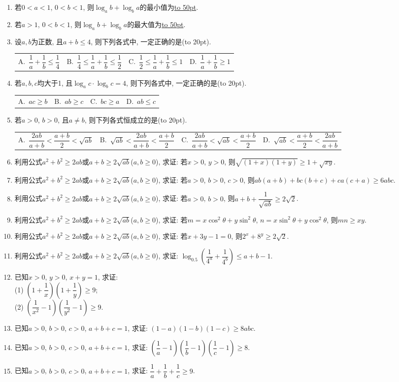 \documentclass[10pt,a4paper]{article}
\newcommand{\blank}[1]{\underline{\hbox to #1pt{}}}
\newcommand{\bracket}[1]{(\hbox to #1pt{})}
\newcommand{\fourch}[4]{\par\begin{tabular}{p{.23\textwidth}p{.23\textwidth}p{.23\textwidth}p{.23\textwidth}}
A.~#1 &B.~#2& C.~#3& D.~#4
\end{tabular}}
\begin{document}
\begin{enumerate}[1.]
\item 若$0<a<1$, $0<b<1$, 则$\log_ab+\log_ba$的最小值为\blank{50}.
\item 若$a>1$, $0<b<1$, 则$\log_ab+\log_ba$的最大值为\blank{50}.
\item 设$a,b$为正数, 且$a+b\le 4$, 则下列各式中, 一定正确的是\bracket{20}.
\fourch{$\dfrac 1a+\dfrac 1b\le \dfrac 14$}{$\dfrac 14\le \dfrac 1a+\dfrac 1b\le \dfrac 12$}{$\dfrac 12\le \dfrac 1a+\dfrac 1b\le 1$}{$\dfrac 1a+\dfrac 1b\ge 1$}
\item 若$a,b,c$均大于1, 且$\log_ac\cdot \log_bc=4$, 则下列各式中, 一定正确的是\bracket{20}.
\fourch{$ac\ge b$}{$ab\ge c$}{$bc\ge a$}{$ab\le c$}
\item 若$a>0$, $b>0$, 且$a\ne b$, 则下列各式恒成立的是\bracket{20}.
\fourch{$\dfrac{2ab}{a+b}<\dfrac{a+b}2<\sqrt{ab}$}{$\sqrt{ab}<\dfrac{2ab}{a+b}<\dfrac{a+b}2$}{$\dfrac{2ab}{a+b}<\sqrt{ab}<\dfrac{a+b}2$}{$\sqrt{ab}<\dfrac{a+b}2<\dfrac{2ab}{a+b}$}
\item 利用公式$a^2+b^2\ge 2ab$或$a+b\ge 2\sqrt{ab}$($a,b\ge 0$), 求证:
若$x>0$, $y>0$, 则$\sqrt{(1+x)(1+y)}\ge 1+\sqrt{xy}$.
\item 利用公式$a^2+b^2\ge 2ab$或$a+b\ge 2\sqrt{ab}$($a,b\ge 0$), 求证: 若$a>0$, $b>0$, $c>0$, 则$ab(a+b)+bc(b+c)+ca(c+a)\ge 6abc$.
\item 利用公式$a^2+b^2\ge 2ab$或$a+b\ge 2\sqrt{ab}$($a,b\ge 0$), 求证: 若$a>0$, $b>0$, 则$a+b+\dfrac 1{\sqrt{ab}}\ge 2\sqrt 2$.
\item 利用公式$a^2+b^2\ge 2ab$或$a+b\ge 2\sqrt{ab}$($a,b\ge 0$), 求证: 若$m=x{{\cos }^2}\theta +y{{\sin }^2}\theta$, $n=x{{\sin }^2}\theta +y{{\cos }^2}\theta$, 则$mn\ge xy$.
\item 利用公式$a^2+b^2\ge 2ab$或$a+b\ge 2\sqrt{ab}$($a,b\ge 0$), 求证: 若$x+3y-1=0$, 则${2^x}+{8^y}\ge 2\sqrt 2$.
\item 利用公式$a^2+b^2\ge 2ab$或$a+b\ge 2\sqrt{ab}$($a,b\ge 0$), 求证: $\log_{0.5}(\dfrac 1{4^a}+\dfrac 1{4^b})\le a+b-1$.
\item 已知$x>0$, $y>0$, $x+y=1$, 求证:\\
(1) $(1+\dfrac 1x)(1+\dfrac 1y)\ge 9$;\\
(2) $(\dfrac 1{x^2}-1)(\dfrac 1{y^2}-1)\ge 9$.
\item 已知$a>0$, $b>0$, $c>0$, $a+b+c=1$, 求证: $(1-a)(1-b)(1-c)\ge 8abc$.
\item 已知$a>0$, $b>0$, $c>0$, $a+b+c=1$, 求证: $(\dfrac 1a-1)(\dfrac 1b-1)(\dfrac 1c-1)\ge 8$.
\item 已知$a>0$, $b>0$, $c>0$, $a+b+c=1$, 求证: $\dfrac 1a+\dfrac 1b+\dfrac 1c\ge 9$.

\end{enumerate}
\end{document}
